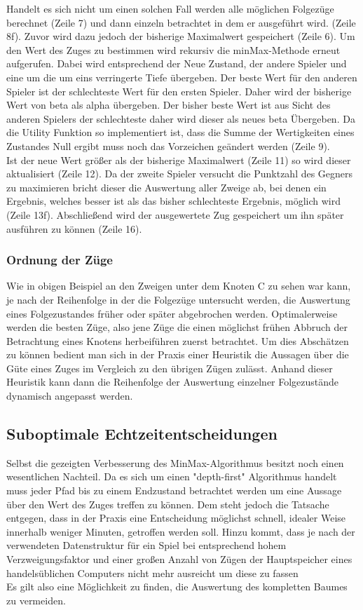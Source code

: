 Handelt es sich nicht um einen solchen Fall werden alle möglichen Folgezüge berechnet (Zeile 7) und dann einzeln betrachtet in dem er ausgeführt wird. (Zeile 8f). Zuvor wird dazu jedoch der bisherige Maximalwert gespeichert (Zeile 6).
Um den Wert des Zuges zu bestimmen wird rekursiv die minMax-Methode erneut aufgerufen. Dabei wird entsprechend der Neue Zustand, der andere Spieler und eine um die um eins verringerte Tiefe übergeben. Der beste Wert für den anderen Spieler ist der schlechteste Wert für den ersten Spieler. Daher wird der bisherige Wert von beta als alpha übergeben. Der bisher beste Wert ist aus Sicht des anderen Spielers der schlechteste daher wird dieser als neues beta Übergeben. Da die Utility Funktion so implementiert ist, dass die Summe der Wertigkeiten eines Zustandes Null ergibt muss noch das Vorzeichen geändert werden (Zeile 9).\\
Ist der neue Wert größer als der bisherige Maximalwert (Zeile 11) so wird dieser aktualisiert (Zeile 12).
Da der zweite Spieler versucht die Punktzahl des Gegners zu maximieren bricht dieser die Auswertung aller Zweige ab, bei denen ein Ergebnis, welches besser ist als das bisher schlechteste Ergebnis, möglich wird (Zeile 13f).
Abschließend wird der ausgewertete Zug gespeichert um ihn später ausführen zu können (Zeile 16).
\subsubsection{Ordnung der Züge}
Wie in obigen Beispiel an den Zweigen unter dem Knoten C zu sehen war kann, je nach der Reihenfolge in der die Folgezüge untersucht werden, die Auswertung eines Folgezustandes früher oder später abgebrochen werden. Optimalerweise werden die besten Züge, also jene Züge die einen möglichst frühen Abbruch der Betrachtung eines Knotens herbeiführen zuerst betrachtet. Um dies Abschätzen zu können bedient man sich in der Praxis einer Heuristik die Aussagen über die Güte eines Zuges im Vergleich zu den übrigen Zügen zulässt. Anhand dieser Heuristik kann dann die Reihenfolge der Auswertung einzelner Folgezustände dynamisch angepasst werden.

\subsection{Suboptimale Echtzeitentscheidungen}
Selbst die gezeigten Verbesserung des MinMax-Algorithmus besitzt noch einen wesentlichen Nachteil. Da es sich um einen "depth-first" Algorithmus handelt muss jeder Pfad bis zu einem Endzustand betrachtet werden um eine Aussage über den Wert des Zuges treffen zu können. Dem steht jedoch die Tatsache entgegen, dass in der Praxis eine Entscheidung möglichst schnell, idealer Weise innerhalb weniger Minuten, getroffen werden soll. Hinzu kommt, dass je nach der verwendeten Datenstruktur für ein Spiel bei entsprechend hohem Verzweigungsfaktor und einer großen Anzahl von Zügen der Hauptspeicher eines handelsüblichen Computers nicht mehr ausreicht um diese zu fassen\\
Es gilt also eine Möglichkeit zu finden, die Auswertung des kompletten Baumes zu vermeiden.

